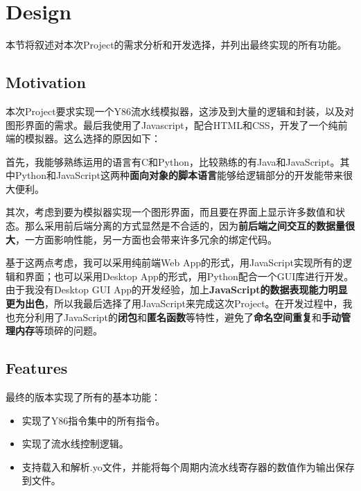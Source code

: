 
\section{Design}

本节将叙述对本次Project的需求分析和开发选择，并列出最终实现的所有功能。

\subsection{Motivation}

本次Project要求实现一个Y86流水线模拟器，这涉及到大量的逻辑和封装，以及对图形界面的需求。最后我使用了Javascript，配合HTML和CSS，开发了一个纯前端的模拟器。这么选择的原因如下：

首先，我能够熟练运用的语言有C和Python，比较熟练的有Java和JavaScript。其中Python和JavaScript这两种{\bf 面向对象的脚本语言}能够给逻辑部分的开发能带来很大便利。

其次，考虑到要为模拟器实现一个图形界面，而且要在界面上显示许多数值和状态。那么采用前后端分离的方式显然是不合适的，因为{\bf 前后端之间交互的数据量很大}，一方面影响性能，另一方面也会带来许多冗余的绑定代码。

基于这两点考虑，我可以采用纯前端Web App的形式，用JavaScript实现所有的逻辑和界面；也可以采用Desktop App的形式，用Python配合一个GUI库进行开发。由于我没有Desktop GUI App的开发经验，加上{\bf JavaScript的数据表现能力明显更为出色}，所以我最后选择了用JavaScript来完成这次Project。在开发过程中，我也充分利用了JavaScript的{\bf 闭包}和{\bf 匿名函数}等特性，避免了{\bf 命名空间重复}和{\bf 手动管理内存}等琐碎的问题。

\subsection{Features}

最终的版本实现了所有的基本功能：
\begin{itemize}
\item 实现了Y86指令集中的所有指令。
\item 实现了流水线控制逻辑。
\item 支持载入和解析.yo文件，并能将每个周期内流水线寄存器的数值作为输出保存到文件。
\end{itemize}

